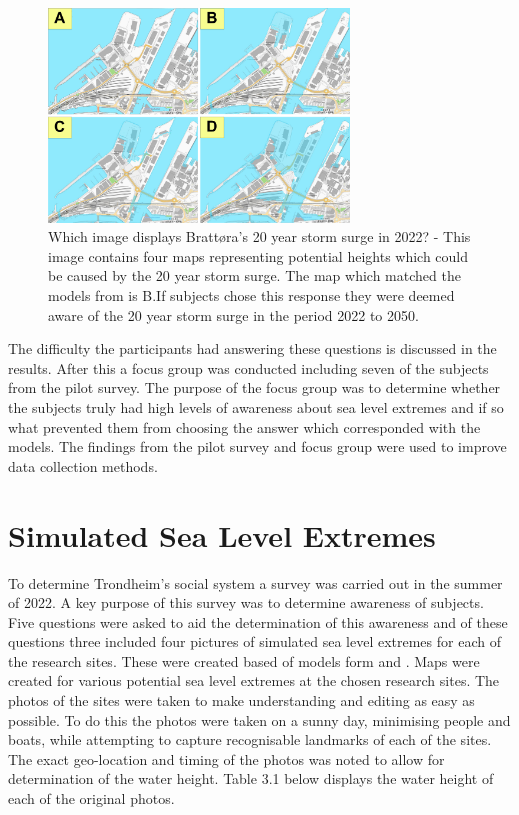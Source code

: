 \begin{figure}[h!]
    \centering
    \includegraphics[width=8cm]{fig/brattora question on 2022 20 yr storm surge quadrant.png}
    \caption{Which image displays Brattøra's 20 year storm surge in 2022? - This image contains four maps representing potential heights which could be caused by the 20 year storm surge. The map which matched the models from \cite{kartverket_se_2021} is B.If subjects chose this response they were deemed aware of the 20 year storm surge in the period 2022 to 2050.}
    \label{fig:brattora_2022_stormsurge}
\end{figure}

The difficulty the participants had answering these questions is discussed in the results. After this a focus group was conducted including seven of the subjects from the pilot survey. The purpose of the focus group was to determine whether the subjects truly had high levels of awareness about sea level extremes and if so what prevented them from choosing the answer which corresponded with the models. The findings from the pilot survey and focus group were used to improve data collection methods. 

\section{Simulated Sea Level Extremes}
To determine Trondheim's social system a survey was carried out in the summer of 2022. A key purpose of this survey was to determine awareness of subjects. 
Five questions were asked to aid the determination of this awareness and of these questions three included four pictures of simulated sea level extremes for each of the research sites. These were created based of models form \cite{dsb_integrating-sea-level-rise-and-storm-surges--local-planningpdf_2017} and \cite{kartverket_se_2020}. Maps were created for various potential sea level extremes at the chosen research sites. The photos of the sites were taken to make understanding and editing as easy as possible. To do this the photos were taken on a sunny day, minimising people and boats, while attempting to capture recognisable landmarks of each of the sites. The exact geo-location and timing of the photos was noted to allow for determination of the water height. Table 3.1 below displays the water height of each of the original photos. 

